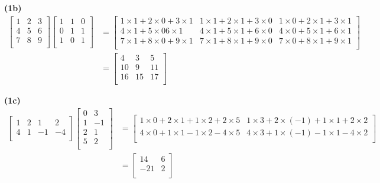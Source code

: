 \documentclass[12pt,article]{article}
\begin{document}
\textbf{(1b)} 
\begin{align*}
    \left[\begin{array}{ccc}
        1 & 2 & 3 \\
        4 & 5 & 6 \\
        7 & 8 & 9 \\
    \end{array}\right]
    \begin{bmatrix}
        1 & 1 & 0 \\
        0 & 1 & 1 \\
        1 & 0 & 1 \\
    \end{bmatrix}
    {} &=
    \begin{bmatrix}
        1\times1 + 2\times0 + 3\times1 & 1\times1 + 2\times1 + 3\times0 & 1\times0 + 2\times1 + 3\times1 \\
        4\times1 + 5\times0 6\times1 & 4\times1 + 5\times1 + 6\times0 & 4\times0 + 5\times1 + 6\times1 \\
        7\times1 + 8\times0 + 9\times1 & 7\times1 + 8\times1 + 9\times0 & 7\times0 + 8\times1 + 9\times1 \\
    \end{bmatrix}
    \\ {} &=
    \begin{bmatrix}
        4 & 3 & 5 \\
        10 & 9 & 11 \\
        16 & 15 & 17 \\
    \end{bmatrix}
\end{align*}

\textbf{(1c)}
\begin{align*}
    \left[\begin{array}{cccc}
        1 & 2 & 1 & 2 \\
        4 & 1 & -1 & -4 \\
    \end{array}\right]
    \begin{bmatrix}
        0 & 3 \\
        1 & -1 \\
        2 & 1 \\
        5 & 2 \\
    \end{bmatrix}
    {} &=
    \begin{bmatrix}
        1\times0 + 2\times1 + 1\times2 + 2\times5 & 1\times3 + 2\times(-1) + 1\times1 + 2\times2\\
        4\times0 + 1\times1 - 1\times2 - 4\times5& 4\times3 + 1\times(-1) - 1\times1 - 4\times2\\
    \end{bmatrix}
    \\ {} &=
    \begin{bmatrix}
        14 & 6 \\
        -21 & 2 \\
    \end{bmatrix}
\end{align*}
\end{document}
